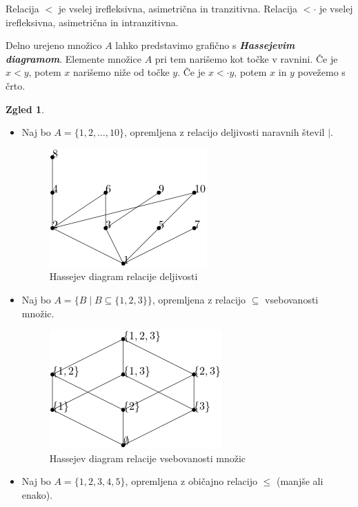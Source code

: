 \documentclass[11pt]{book}
\def\definicija{\color{rdeca}\bf\em}
\theoremstyle{definition}
\theoremstyle{zgled}
\newtheorem*{zgled}{Zgled}
\theoremstyle{odprtproblem}
\theoremstyle{domacanaloga}
\theoremstyle{izrek}
\begin{document}
Relacija $<$ je vselej irefleksivna, asimetrična in tranzitivna. Relacija $< \cdot$ je vselej irefleksivna, asimetrična in intranzitivna.

Delno urejeno množico $A$ lahko predstavimo grafično s {\definicija Hassejevim diagramom}. Elemente množice $A$ pri tem narišemo kot točke v ravnini. Če je $x < y$, potem $x$ narišemo niže od točke $y$. Če je $x < \cdot y$, potem $x$ in $y$ povežemo s črto.

\begin{zgled} \leavevmode
\begin{itemize}
    \item Naj bo $A = \{ 1,2,\dots, 10 \}$, opremljena z relacijo deljivosti naravnih števil $|$.
    
    \begin{figure}[h]
        \centering
        \includegraphics[width=0.5\linewidth]{img/relacije-hasse.png}
        \caption{Hassejev diagram relacije deljivosti}
    \end{figure}
    
    \item Naj bo $A = \{ B \mid B \subseteq \{ 1,2,3 \} \}$, opremljena z relacijo $\subseteq$ vsebovanosti množic.
    
    \begin{figure}[h]
        \centering
        \includegraphics[width=0.5\linewidth]{img/relacije-hasse-mnozice.png}
        \caption{Hassejev diagram relacije vsebovanosti množic}
    \end{figure}

    \item Naj bo $A = \{ 1,2,3,4,5 \}$, opremljena z običajno relacijo $\leq$ (manjše ali enako).
    

\end{itemize}
\end{zgled}
\end{document}
